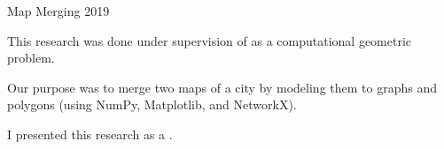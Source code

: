 \begin{cvprojects}
  \cvproject
    {Map Merging} %
    {} %
    {} %
    {2019} %
    {
      \begin{cvitems} %
        \item {This research was done under supervision of  as a computational geometric problem.}
        \item {Our purpose was to merge two maps of a city by modeling them to graphs and polygons (using NumPy, Matplotlib, and NetworkX).}
        \item {I presented this research as a .}
      \end{cvitems}
    }

\end{cvprojects}